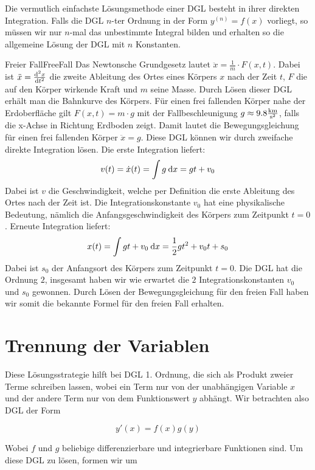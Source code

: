 Die vermutlich einfachste Lösungsmethode einer DGL besteht in ihrer direkten Integration. Falls die DGL $n$-ter Ordnung in der Form $y^{(n)} = f(x)$ vorliegt, so müssen wir nur $n$-mal das unbestimmte Integral bilden und erhalten so die allgemeine Lösung der DGL mit $n$ Konstanten.

\begin{example}{Freier Fall}{FreeFall}
    Das Newtonsche Grundgesetz lautet $\ddot{x} = \frac{1}{m}\cdot F(x,t)$. Dabei ist $\ddot{x} = \frac{\mathrm{d}^{2}{x}}{\mathrm{d}{t^{2}}}$ die zweite Ableitung des Ortes eines Körpers $x$ nach der Zeit $t$, $F$ die auf den Körper wirkende Kraft und $m$ seine Masse. Durch Lösen dieser DGL erhält man die Bahnkurve des Körpers. Für einen frei fallenden Körper nahe der Erdoberfläche gilt $F(x,t)=m \cdot g$ mit der Fallbeschleunigung $g\approx 9.8\frac{\text{km}}{\text{s}^2}$, falls die x-Achse in Richtung Erdboden zeigt. Damit lautet die Bewegungsgleichung für einen frei fallenden Körper $\ddot{x} = g$. Diese DGL können wir durch zweifache direkte Integration lösen. Die erste Integration liefert:
    $$
        v(t) = \dot{x}(t) = \int g \:\mathrm{d}{x} = gt +v_0
    $$
    Dabei ist $v$ die Geschwindigkeit, welche per Definition die erste Ableitung des Ortes nach der Zeit ist. Die Integrationskonstante $v_0$ hat eine physikalische Bedeutung, nämlich die Anfangsgeschwindigkeit des Körpers zum Zeitpunkt $t=0$. Erneute Integration liefert:
    $$
        x(t) = \int gt + v_0 \:\mathrm{d}{x} = \frac{1}{2} g t^2 + v_0 t + s_0
    $$
    Dabei ist $s_0$ der Anfangsort des Körpers zum Zeitpunkt $t=0$. Die DGL hat die Ordnung $2$, insgesamt haben wir wie erwartet die $2$ Integrationskonstanten $v_0$ und $s_0$ gewonnen. Durch Lösen der Bewegungsgleichung für den freien Fall haben wir somit die bekannte Formel für den freien Fall erhalten.
\end{example}

\section{Trennung der Variablen}

Diese Lösungsstrategie hilft bei DGL 1. Ordnung, die sich als Produkt zweier Terme schreiben lassen, wobei ein Term nur von der unabhängigen Variable $x$ und der andere Term nur von dem Funktionswert $y$ abhängt. Wir betrachten also DGL der Form

$$
   y'(x) = f(x) g(y)
$$

Wobei $f$ und $g$ beliebige differenzierbare und integrierbare Funktionen sind. Um diese DGL zu lösen, formen wir um

